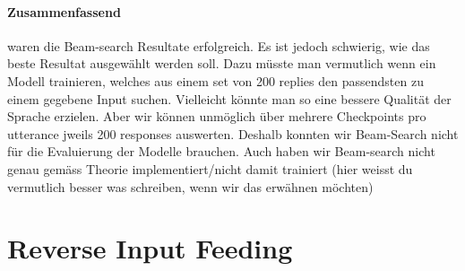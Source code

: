 \paragraph{Zusammenfassend} waren die Beam-search Resultate erfolgreich. Es ist jedoch schwierig, wie das beste Resultat ausgewählt werden soll. Dazu müsste man vermutlich wenn ein Modell trainieren, welches aus einem set von 200 replies den passendsten zu einem gegebene Input suchen. Vielleicht könnte man so eine bessere Qualität der Sprache erzielen. Aber wir können unmöglich über mehrere Checkpoints pro utterance jweils 200 responses auswerten. Deshalb konnten wir Beam-Search nicht für die Evaluierung der Modelle brauchen. Auch haben wir Beam-search nicht genau gemäss Theorie implementiert/nicht damit trainiert (hier weisst du vermutlich besser was schreiben, wenn wir das erwähnen möchten)
\section{Reverse Input Feeding}
\blindtext